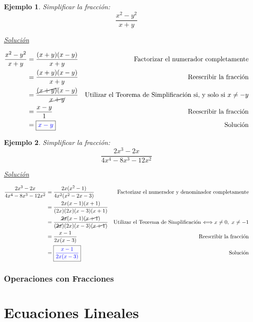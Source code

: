 \documentclass[letterpaper, 10pt, oneside]{book}
\newtheorem{example}{Ejemplo}[section]
\begin{document}
		\begin{example}
			Simplificar la fracción: $$\frac{x^2-y^2}{x+y}$$
			\vspace{1mm}
			
			\underline{Solución}
			
			\begin{align*}
				\frac{x^2-y^2}{x+y} & = \frac{(x+y)(x-y)}{x+y} & \text{Factorizar el numerador completamente}\\
				&=\frac{(x+y)(x-y)}{x+y}  & \text{Reescribir la fracción}\\
				&=\frac{\cancel{(x+y)}(x-y)}{\cancel{x+y}} & \text{Utilizar el Teorema de Simplificación si, y solo si $x\neq -y$}\\
				&=\frac{x-y}{1}  & \text{Reescribir la fracción}\\
				&= \fbox{\color{blue}{$x-y$}} & \text{Solución}
			\end{align*}
		\end{example}
	
		\begin{example}
			Simplificar la fracción: $$\frac{2x^3-2x}{4x^4-8x^3-12x^2}$$
			
			\vspace{1mm}
			\underline{Solución}
			
			\begin{align*}
				\frac{2x^3-2x}{4x^4-8x^3-12x^2} & = \frac{2x(x^2-1)}{4x^2(x^2-2x-3)} & \text{Factorizar el numerador y denominador completamente}\\
				& = \frac{2x(x-1)(x+1)}{(2x)(2x)(x-3)(x+1)}\\
				&=\frac{\cancel{2x}(x-1)(\cancel{x+1})}{(\cancel{2x})(2x)(x-3)(\cancel{x+1})}  & \text{Utilizar el Teorema de Simplificación $\Longleftrightarrow x\neq 0, \ x\neq -1$}\\
				&= \frac{x-1}{2x(x-3)} & \text{Reescribir la fracción}\\
				&= \fbox{\color{blue}{$\displaystyle{\frac{x-1}{2x(x-3)}}$}} & \text{Solución}
			\end{align*}
		\end{example}
	
	\subsection{Operaciones con Fracciones}
	
	\chapter{Ecuaciones Lineales}
	
\end{document}
